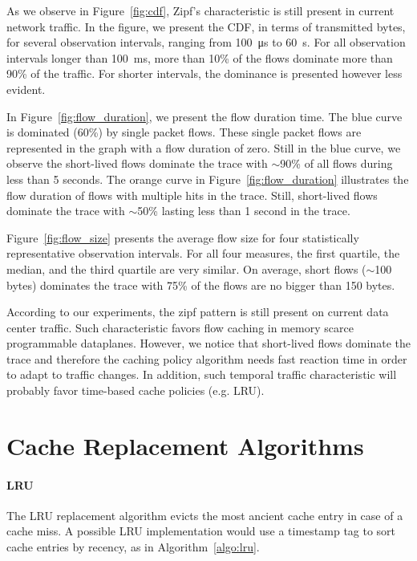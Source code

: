As we observe in Figure~\ref{fig:cdf}, Zipf's characteristic is still present in current network traffic.
In the figure, we present the CDF, in terms of transmitted bytes, for several observation intervals, ranging from \SI{100}{\micro\second} to \SI{60}{\second}.
For all observation intervals longer than \SI{100}{\milli\second}, more than 10\% of the flows dominate more than 90\% of the traffic.
For shorter intervals, the dominance is presented however less evident.

In Figure~\ref{fig:flow_duration}, we present the flow duration time.
The blue curve is dominated (60\%) by single packet flows.
These single packet flows are represented in the graph with a flow duration of zero.
Still in the blue curve, we observe the short-lived flows dominate the trace with $\sim$90\% of all flows during less than 5 seconds.
The orange curve in Figure~\ref{fig:flow_duration} illustrates the flow duration of flows with multiple hits in the trace.
Still, short-lived flows dominate the trace with $\sim$50\% lasting less than 1 second in the trace.

Figure~\ref{fig:flow_size} presents the average flow size for four statistically representative observation intervals.
For all four measures, the first quartile, the median, and the third quartile are very similar.
On average, short flows ($\sim$100 bytes) dominates the trace with 75\% of the flows are no bigger than 150 bytes.

According to our experiments, the zipf pattern is still present on current data center traffic.
Such characteristic favors flow caching in memory scarce programmable dataplanes.
However, we notice that short-lived flows dominate the trace and therefore the caching policy algorithm needs fast reaction time in order to adapt to traffic changes.
In addition, such temporal traffic characteristic will probably favor time-based cache policies (e.g. LRU).

\section{Cache Replacement Algorithms}\label{sec:policies}

\paragraph{LRU}
The LRU replacement algorithm evicts the most ancient cache entry in case of a cache miss.
A possible LRU implementation would use a timestamp tag to sort cache entries by recency, as in Algorithm~\ref{algo:lru}.

